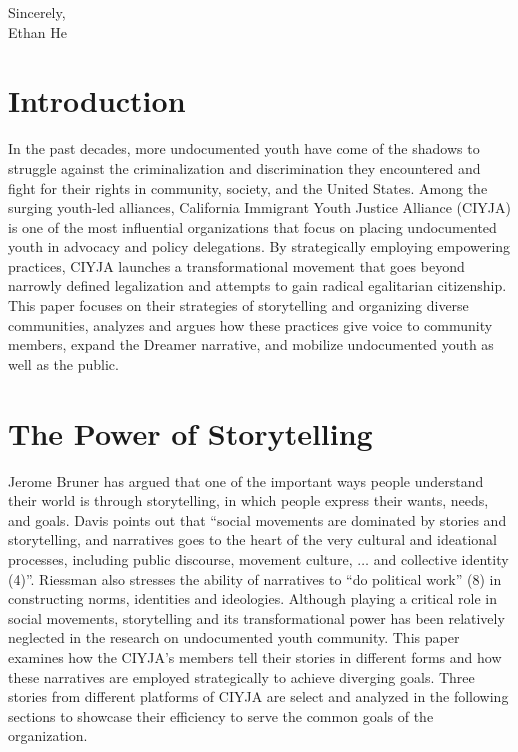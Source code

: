 \documentclass[12pt]{article}
\begin{document}
\begin{flushleft}
\noindent
Sincerely, \\
\noindent
Ethan He


\section{Introduction}

In the past decades, more undocumented youth have come of the shadows to struggle against the criminalization and discrimination they encountered and fight for their rights in community, society, and the United States. 
Among the surging youth-led alliances, California Immigrant Youth Justice Alliance (CIYJA) is one of the most influential organizations that focus on placing undocumented youth in advocacy and policy delegations. 
By strategically employing empowering practices, CIYJA launches a transformational movement that goes beyond narrowly defined legalization and attempts to gain radical egalitarian citizenship.
This paper focuses on their strategies of storytelling and organizing diverse communities, analyzes and argues how these practices give voice to community members, expand the Dreamer narrative, and mobilize undocumented youth as well as the public.

\section{The Power of Storytelling}

Jerome Bruner has argued that one of the important ways people understand their world is through storytelling, 
in which people express their wants, needs, and goals. %
Davis points out that ``social movements are dominated by stories and storytelling, and narratives goes to the heart of the very cultural and ideational processes, including public discourse, movement culture, $\ldots$ and collective identity (4)''. %
Riessman also stresses the ability of narratives to ``do political work'' (8) in constructing norms, identities and ideologies. %
Although playing a critical role in social movements, storytelling and its transformational power has been relatively neglected in the research on undocumented youth community. 
This paper examines how the CIYJA's members tell their stories in different forms and how these narratives are employed strategically to achieve diverging goals. 
Three stories from different platforms of CIYJA are select and analyzed in the following sections to showcase their efficiency to serve the common goals of the organization.


\end{flushleft}
\end{document}
